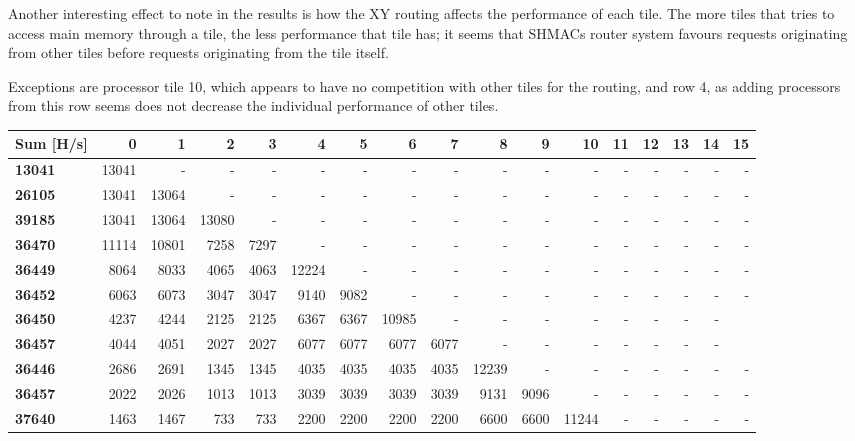 Another interesting effect to note in the results is how the XY routing affects the performance
of each tile. The more tiles that tries to access main memory through a tile, the less
performance that tile has; it seems that SHMACs router system favours requests originating
from other tiles before requests originating from the tile itself.

Exceptions are processor tile 10, which appears to have no competition with other tiles for the routing, and row 4, as adding processors from this row seems does not decrease the individual performance of other tiles. 

\begin{flushleft}
\begin{table}
\tiny
\begin{tabular}{| l || r r r r | r r r r | r r r | r r r r r |}
  \hline 
  \textbf{Sum} [H/s] & \textbf{0} & \textbf{1} & \textbf{2} & \textbf{3} & \textbf{4} & \textbf{5} & \textbf{6} & \textbf{7} & \textbf{8} & \textbf{9} & \textbf{10} & \textbf{11} & \textbf{12} & \textbf{13} & \textbf{14} & \textbf{15}   \\
  \hline                       
  \textbf{13041} & 13041 & - & - & - & - & - & - & - & - & - & - & - & - & - & - & - \\
  \textbf{26105} & 13041 & 13064 & - & - & - & - & - & - & - & - & - & - & - & - & - & - \\
  \textbf{39185} & 13041 & 13064 & 13080 & - & - & - & - & - & - & - & - & - & - & - & - & - \\
  \textbf{36470} & 11114 & 10801 & 7258 & 7297 & - & - & - & - & - & - & - & - & - & - & - & - \\
  \textbf{36449} & 8064 & 8033 & 4065 & 4063 & 12224 & - & - & - & - & - & - & - & - & - & - & - \\
  \textbf{36452} & 6063 & 6073 & 3047 & 3047 & 9140 & 9082 & - & - & - & - & - & - & - & - & - & - \\
  \textbf{36450} & 4237 & 4244 & 2125 & 2125 & 6367 & 6367 & 10985 & - & - & - & - & - & - & - & -\\
  \textbf{36457} & 4044 & 4051 & 2027 & 2027 & 6077 & 6077 & 6077 & 6077 & - & - & - & - & - & - & - \\
  \textbf{36446} & 2686 & 2691 & 1345 & 1345 & 4035 & 4035 & 4035 & 4035 & 12239 & - & - & - & - & - & - & -\\
  \textbf{36457} & 2022 & 2026 & 1013 & 1013 & 3039 & 3039 & 3039 & 3039 & 9131 & 9096 & - & - & - & - & - & -\\
  \textbf{37640} & 1463 & 1467 & 733 & 733 & 2200 & 2200 & 2200 & 2200 & 6600 & 6600 & 11244 & - & - & - & - & -\\

\end{tabular}
\end{table}
\end{flushleft}
